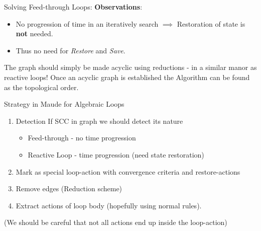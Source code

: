 \documentclass{beamer}
\begin{document}
\begin{frame}{Solving Feed-through Loops:}
    \textbf{Observations}: 
    \begin{itemize}
        \item No progression of time in an iteratively search $\implies$ Restoration of state is \textbf{not} needed.
        \item Thus no need for \textit{Restore} and \textit{Save}.
    \end{itemize}

    The graph should simply be made acyclic using reductions - in a similar manor as reactive loops! Once an acyclic graph is established the Algorithm can be found as the topological order.
\end{frame}

\begin{frame}{Strategy in Maude for Algebraic Loops}
    \begin{enumerate}
        \item Detection If SCC in graph we should detect its nature
        \begin{itemize}
            \item Feed-through - no time progression
            \item Reactive Loop - time progression (need state restoration)
        \end{itemize}
        \item Mark as special loop-action with convergence criteria and restore-actions
        \item Remove edges (Reduction scheme) 
        \item Extract actions of loop body (hopefully using normal rules).
    \end{enumerate}  
    (We should be careful that not all actions end up inside the loop-action)
\end{frame}
\end{document}
